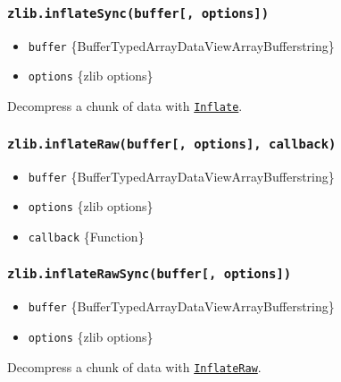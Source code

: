 \subsubsection{\texorpdfstring{\texttt{zlib.inflateSync(buffer{[},\ options{]})}}{zlib.inflateSync(buffer{[}, options{]})}}\label{zlib.inflatesyncbuffer-options}

\begin{itemize}
\tightlist
\item
  \texttt{buffer}
  \{Buffer\textbar TypedArray\textbar DataView\textbar ArrayBuffer\textbar string\}
\item
  \texttt{options} \{zlib options\}
\end{itemize}

Decompress a chunk of data with
\hyperref[class-zlibinflate]{\texttt{Inflate}}.

\subsubsection{\texorpdfstring{\texttt{zlib.inflateRaw(buffer{[},\ options{]},\ callback)}}{zlib.inflateRaw(buffer{[}, options{]}, callback)}}\label{zlib.inflaterawbuffer-options-callback}

\begin{itemize}
\tightlist
\item
  \texttt{buffer}
  \{Buffer\textbar TypedArray\textbar DataView\textbar ArrayBuffer\textbar string\}
\item
  \texttt{options} \{zlib options\}
\item
  \texttt{callback} \{Function\}
\end{itemize}

\subsubsection{\texorpdfstring{\texttt{zlib.inflateRawSync(buffer{[},\ options{]})}}{zlib.inflateRawSync(buffer{[}, options{]})}}\label{zlib.inflaterawsyncbuffer-options}

\begin{itemize}
\tightlist
\item
  \texttt{buffer}
  \{Buffer\textbar TypedArray\textbar DataView\textbar ArrayBuffer\textbar string\}
\item
  \texttt{options} \{zlib options\}
\end{itemize}

Decompress a chunk of data with
\hyperref[class-zlibinflateraw]{\texttt{InflateRaw}}.


